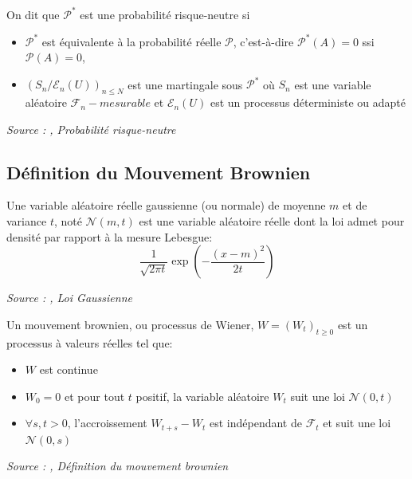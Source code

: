 \begin{definition}\label{def:mesure_risque_neutre}
On dit que $\mathcal{P}^*$ est une probabilité risque-neutre si
\begin{itemize}
    \item $\mathcal{P}^*$ est équivalente à la probabilité réelle $\mathcal{P}$, c'est-à-dire $\mathcal{P}^*(A) = 0$ ssi $\mathcal{P}(A) = 0$,
    \item $(S_n/\mathcal{E}_n(U))_{n\leq N}$ est une martingale sous $\mathcal{P}^*$ où $S_n$ est une variable aléatoire $\mathcal{F}_n-mesurable$ et $\mathcal{E}_n(U)$ est un processus déterministe ou adapté
\end{itemize}

\noindent\textit{Source : \cite{martingales_finance},  Probabilité risque-neutre}
\end{definition}


\subsection{Définition du Mouvement Brownien}

\begin{definition}\label{def:lois_gaussienes}
Une variable aléatoire réelle gaussienne (ou normale) de moyenne $m$ et de variance $t$, noté $\mathcal{N}(m, t)$ est une variable aléatoire réelle dont la loi admet pour densité par rapport à la mesure Lebesgue:
$$\frac{1}{\sqrt{2\pi t}}\exp(-\frac{(x -m)^2}{2t})$$

\noindent\textit{Source : \cite{martingales_finance},  Loi Gaussienne}
\end{definition}

\begin{definition}\label{def:mouvement_brownien}
Un mouvement brownien, ou processus de Wiener, $W = (W_t)_{t \ge 0}$ est un processus à valeurs réelles tel que:
\begin {itemize}
	\item $W$ est continue
    \item $W_0 = 0$ et pour tout $t$ positif, la variable aléatoire $W_t$ suit une loi $\mathcal{N}(0, t)$
    \item $\forall s, t > 0$, l'accroissement $W_{t+s} - W_t$ est indépendant de $\mathcal{F}_t$ et suit une loi $\mathcal{N}(0, s)$
\end {itemize}

\noindent\textit{Source : \cite{martingales_finance},  Définition du mouvement brownien}
\end{definition}



